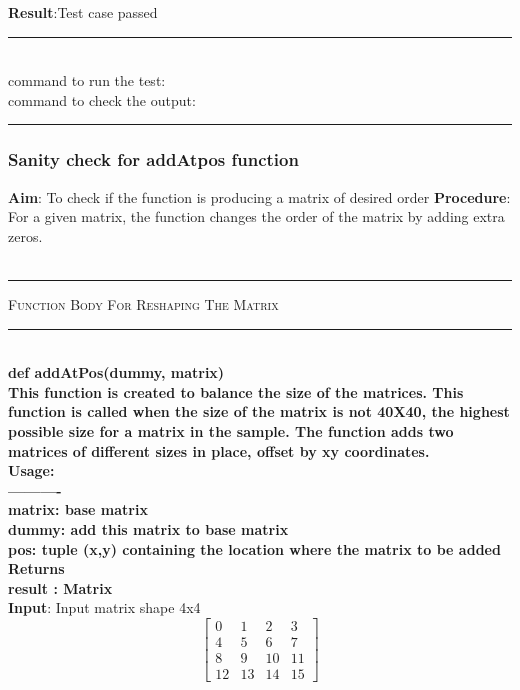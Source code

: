 \documentclass[fleqn, 12.5pt,a4paper]{report}
\begin{document}
\textbf{Result}:Test case passed
\\
{\rule{\linewidth}{0.02cm}}\\
command to run the test: {\selectfont {}}\\
command to check the output: {\selectfont {}}\\
{\rule{\linewidth}{0.02cm}}

\subsubsection{Sanity check for addAtpos function}
\textbf{Aim}: To check if the function is producing a matrix of desired order \newline
\textbf{Procedure}: For a given matrix, the function changes the order of the matrix by adding extra zeros.\\
\\
{ \rule{\linewidth}{0.05cm}}
	{\scshape Function Body For Reshaping The Matrix}\\
{ \rule{\linewidth}{0.05cm}}
{\selectfont
\\
\textbf{def addAtPos(dummy, matrix)\\
    This function is created to balance the size of the matrices. This function is called when the size of the matrix is not  40X40, the highest possible size for a matrix in the sample. The function adds two matrices of different sizes in place, offset by xy \newline 
    coordinates.\\
    Usage:\\
    ----------\\
    matrix: base matrix\\
    dummy: add this matrix to base matrix\\
    pos: tuple (x,y) containing the location where the matrix to be added\\
    Returns\\
    result : Matrix\\
    }}
\textbf{Input}: Input matrix shape 4x4
$$
 \begin{bmatrix}
0 & 1 & 2 & 3 \\
4 & 5 & 6 & 7 \\
8 & 9 & 10 & 11 \\
12 & 13 & 14 & 15 
\end{bmatrix}
$$
\end{document}

